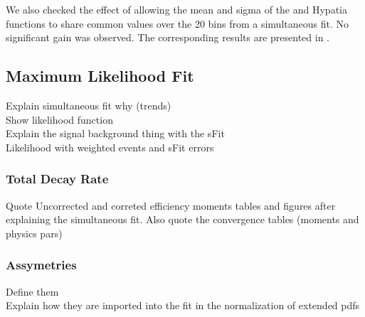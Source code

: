We also checked the effect of allowing the mean and sigma of the \Bs and \Bd Hypatia functions to share common values over the 20 bins from
a simultaneous fit. No significant gain was observed. The corresponding results are presented in . 


\subsection{Maximum Likelihood Fit}
\label{Total_Decay_Rate}
Explain simultaneous fit why (trends)\\
Show likelihood function\\
Explain the signal background thing with the sFit\\
Likelihood with weighted events and sFit errors\\


\subsubsection{Total Decay Rate}
Quote Uncorrected and correted efficiency moments tables and figures after explaining the simultaneous fit.
Also quote the convergence tables (moments and physics pars)\\


\subsubsection{\CP Assymetries}
Define them\\
Explain how they are imported into the fit in the normalization of extended pdfs\\




